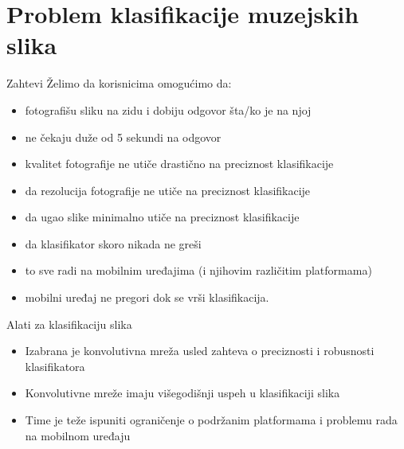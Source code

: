 \documentclass{beamer}
\begin{document}
\section{Problem klasifikacije muzejskih slika}
\begin{frame}{Zahtevi}
    Želimo da korisnicima omogućimo da:
    \begin{itemize}[<+->]
        \item fotografišu sliku na zidu i dobiju odgovor šta/ko je na njoj
        \item ne čekaju duže od 5 sekundi na odgovor
        \item kvalitet fotografije ne utiče drastično na preciznost klasifikacije
        \item da rezolucija fotografije ne utiče na preciznost klasifikacije
        \item da ugao slike minimalno utiče na preciznost klasifikacije
        \item da klasifikator skoro nikada ne greši
        \item to sve radi na mobilnim uređajima (i njihovim različitim platformama)
        \item mobilni uređaj ne pregori dok se vrši klasifikacija.
    \end{itemize}
\end{frame}
\begin{frame}{Alati za klasifikaciju slika}
    \begin{itemize}
        \item Izabrana je konvolutivna mreža usled zahteva o preciznosti i robusnosti klasifikatora
        \item Konvolutivne mreže imaju višegodišnji uspeh u klasifikaciji slika \cite{krizhevsky, microsoftCovnet, r-cnn, cnn-rnn-semantic}
        \item Time je teže ispuniti ograničenje o podržanim platformama i problemu rada na mobilnom uređaju 
    \end{itemize}
\end{frame}
\end{document}

